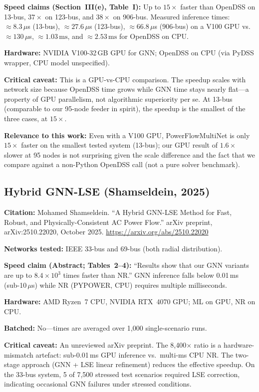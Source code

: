 \documentclass[11pt]{article}
\begin{document}
\textbf{Speed claims (Section~III(e), Table~I):}
Up to $15\times$ faster than OpenDSS on 13-bus, $37\times$ on 123-bus, and
$38\times$ on 906-bus.  Measured inference times: ${\approx}8.3\,\mu$s (13-bus),
${\approx}27.6\,\mu$s (123-bus), ${\approx}66.8\,\mu$s (906-bus) on a V100 GPU
vs.\ ${\approx}130\,\mu$s, ${\approx}1.03\,\text{ms}$, and ${\approx}2.53\,\text{ms}$
for OpenDSS on CPU.

\textbf{Hardware:} NVIDIA V100-32\,GB GPU for GNN; OpenDSS on CPU
(via PyDSS wrapper, CPU model unspecified).

\textbf{Critical caveat:} This is a GPU-vs-CPU comparison.  The speedup scales
with network size because OpenDSS time grows while GNN time stays nearly flat---a
property of GPU parallelism, not algorithmic superiority per se.  At 13-bus
(comparable to our 95-node feeder in spirit), the speedup is the smallest of the
three cases, at $15\times$.

\textbf{Relevance to this work:} Even with a V100 GPU, PowerFlowMultiNet is
only $15\times$ faster on the smallest tested system (13-bus); our GPU result of
$1.6\times$ slower at 95 nodes is not surprising given the scale difference and
the fact that we compare against a non-Python OpenDSS call (not a pure solver
benchmark).

\subsection{Hybrid GNN-LSE (Shamseldein, 2025)}

\textbf{Citation:} Mohamed Shamseldein.
``A Hybrid GNN-LSE Method for Fast, Robust, and Physically-Consistent AC
Power Flow.'' arXiv preprint, arXiv:2510.22020, October 2025.
\url{https://arxiv.org/abs/2510.22020}

\textbf{Networks tested:} IEEE 33-bus and 69-bus (both radial distribution).

\textbf{Speed claim (Abstract; Tables~2--4):}
``Results show that our GNN variants are up to $8.4\times10^3$ times faster
than NR.''  GNN inference falls below 0.01\,ms (sub-10\,$\mu$s) while NR
(PYPOWER, CPU) requires multiple milliseconds.

\textbf{Hardware:} AMD Ryzen~7 CPU, NVIDIA RTX~4070 GPU; ML on GPU, NR on CPU.

\textbf{Batched:} No---times are averaged over 1,000 single-scenario runs.

\textbf{Critical caveat:} An unreviewed arXiv preprint.  The 8,400$\times$ ratio
is a hardware-mismatch artefact: sub-0.01\,ms GPU inference vs.\
multi-ms CPU NR.  The two-stage approach (GNN + LSE linear refinement) reduces the
effective speedup.  On the 33-bus system, 5 of 7,500 stressed test scenarios
required LSE correction, indicating occasional GNN failures under stressed conditions.
\end{document}
